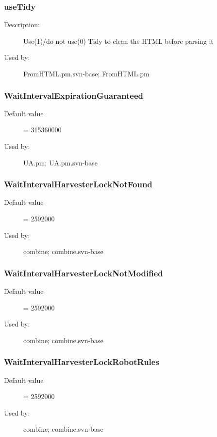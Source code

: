 \subsubsection{useTidy}
\label{useTidy}
\begin{description}
\item[Description:] Use(1)/do not use(0) Tidy to clean the HTML before parsing it
\item[Used by:] FromHTML.pm.svn-base; FromHTML.pm
\end{description}
\subsubsection{WaitIntervalExpirationGuaranteed}
\label{WaitIntervalExpirationGuaranteed}
\begin{description}
\item[Default value] = 315360000
\item[Used by:] UA.pm; UA.pm.svn-base
\end{description}
\subsubsection{WaitIntervalHarvesterLockNotFound}
\label{WaitIntervalHarvesterLockNotFound}
\begin{description}
\item[Default value] = 2592000
\item[Used by:] combine; combine.svn-base
\end{description}
\subsubsection{WaitIntervalHarvesterLockNotModified}
\label{WaitIntervalHarvesterLockNotModified}
\begin{description}
\item[Default value] = 2592000
\item[Used by:] combine; combine.svn-base
\end{description}
\subsubsection{WaitIntervalHarvesterLockRobotRules}
\label{WaitIntervalHarvesterLockRobotRules}
\begin{description}
\item[Default value] = 2592000
\item[Used by:] combine; combine.svn-base
\end{description}
